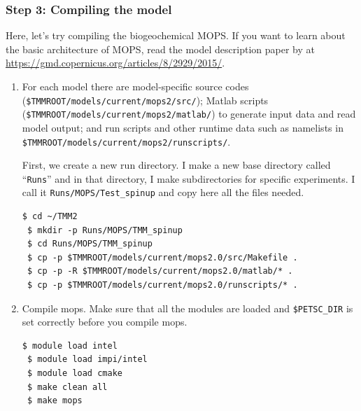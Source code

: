 \documentclass[a4paper]{article}
\def\noin{\noindent }
\begin{document}
\subsubsection{Step 3: Compiling the model}
\noin Here, let's try compiling the biogeochemical MOPS. If you want to learn about the basic architecture of MOPS, read the model description paper by \citet{Kriest15} at \url{https://gmd.copernicus.org/articles/8/2929/2015/}. 

\begin{enumerate}
\item For each model there are model-specific source codes \\ (\verb|$TMMROOT/models/current/mops2/src/|); Matlab scripts \\ (\verb|$TMMROOT/models/current/mops2/matlab/|) to generate input data and read model output; and run scripts and other runtime data such as namelists in \\ 
\verb|$TMMROOT/models/current/mops2/runscripts/|. 

First, we create a new run directory. I make a new base directory called ``\verb|Runs|'' and in that directory, I make subdirectories for specific experiments. I call it \verb|Runs/MOPS/Test_spinup| and copy here all the files needed.

\begin{lstlisting}[style=DOS]
 $ cd ~/TMM2
 $ mkdir -p Runs/MOPS/TMM_spinup
 $ cd Runs/MOPS/TMM_spinup
 $ cp -p $TMMROOT/models/current/mops2.0/src/Makefile .
 $ cp -p -R $TMMROOT/models/current/mops2.0/matlab/* .
 $ cp -p $TMMROOT/models/current/mops2.0/runscripts/* .
\end{lstlisting}

\item Compile mops. Make sure that all the modules are loaded and \verb|$PETSC_DIR| is set correctly before you compile mops.
\begin{lstlisting}[style=DOS]
 $ module load intel
 $ module load impi/intel
 $ module load cmake
 $ make clean all
 $ make mops
\end{lstlisting}


\end{enumerate}
\end{document}

